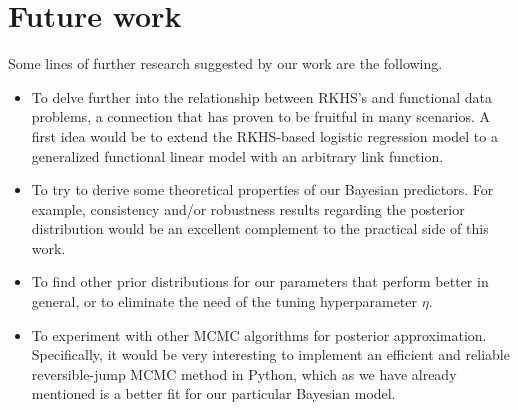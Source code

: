 \section{Future work}

Some lines of further research suggested by our work are the following.

\begin{itemize}
  \item To delve further into the relationship between RKHS's and functional data problems, a connection that has proven to be fruitful in many scenarios. A first idea would be to extend the RKHS-based logistic regression model to a generalized functional linear model with an arbitrary link function.
  \item To try to derive some theoretical properties of our Bayesian predictors. For example, consistency and/or robustness results regarding the posterior distribution would be an excellent complement to the practical side of this work.
  \item To find other prior distributions for our parameters that perform better in general, or to eliminate the need of the tuning hyperparameter \(\eta\).
  \item To experiment with other MCMC algorithms for posterior approximation. Specifically, it would be very interesting to implement an efficient and reliable reversible-jump MCMC method in Python, which as we have already mentioned is a better fit for our particular Bayesian model.
\end{itemize}
